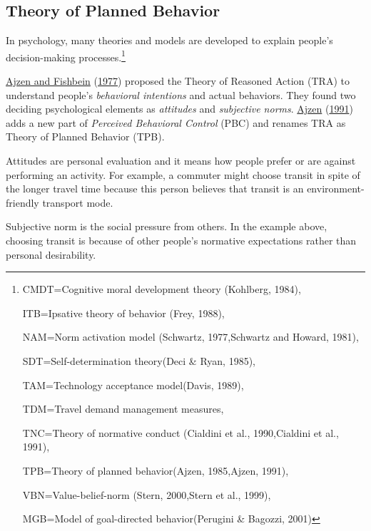 \documentclass[
  11pt,
  openany]{memoir}
\begin{document}
\hypertarget{theory-of-planned-behavior}{%
\subsection{Theory of Planned Behavior}\label{theory-of-planned-behavior}}

In psychology, many theories and models are developed to explain people's decision-making processes.\footnote{CMDT=Cognitive moral development theory (Kohlberg, 1984),

  ITB=Ipsative theory of behavior (Frey, 1988),

  NAM=Norm activation model (Schwartz, 1977,Schwartz and Howard, 1981),

  SDT=Self-determination theory(Deci \& Ryan, 1985),

  TAM=Technology acceptance model(Davis, 1989),

  TDM=Travel demand management measures,

  TNC=Theory of normative conduct (Cialdini et al., 1990,Cialdini et al., 1991),

  TPB=Theory of planned behavior(Ajzen, 1985,Ajzen, 1991),

  VBN=Value-belief-norm (Stern, 2000,Stern et al., 1999),

  MGB=Model of goal-directed behavior(Perugini \& Bagozzi, 2001)}

\protect\hyperlink{ref-ajzenAttitudebehaviorRelationsTheoretical1977}{Ajzen and Fishbein} (\protect\hyperlink{ref-ajzenAttitudebehaviorRelationsTheoretical1977}{1977}) proposed the Theory of Reasoned Action (TRA) to understand people's \emph{behavioral intentions} and actual behaviors.
They found two deciding psychological elements as \emph{attitudes} and \emph{subjective norms}.
\protect\hyperlink{ref-ajzenTheoryPlannedBehavior1991}{Ajzen} (\protect\hyperlink{ref-ajzenTheoryPlannedBehavior1991}{1991}) adds a new part of \emph{Perceived Behavioral Control} (PBC) and renames TRA as Theory of Planned Behavior (TPB).

Attitudes are personal evaluation and it means how people prefer or are against performing an activity. For example, a commuter might choose transit in spite of the longer travel time because this person believes that transit is an environment-friendly transport mode.

Subjective norm is the social pressure from others. In the example above, choosing transit is because of other people's normative expectations rather than personal desirability.
\end{document}
